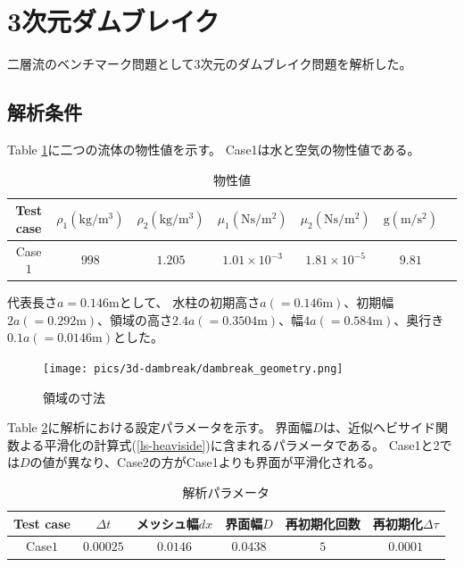 \newpage
\section{3次元ダムブレイク}
二層流のベンチマーク問題として3次元のダムブレイク問題を解析した。

\subsection{解析条件}

Table \ref{table:dambreak-material-property}に二つの流体の物性値を示す。
Case1は水と空気の物性値である。
\renewcommand{\arraystretch}{1}
\begin{table}[H]
	\centering
	\caption{物性値}
	\begin{tabular}{ccccccc}
		\hline
		Test case & $\rho_1 (\mathrm{kg/m^3})$ & $\rho_2 (\mathrm{kg/m^3})$ & $\mu_1 (\mathrm{Ns/m^2})$& $\mu_2 (\mathrm{Ns/m^2})$ & $\mathrm{g} (\mathrm{m/s^2})$ \\
		\hline 
		Case$1$ & $998$ & $1.205$   & $1.01\times10^{-3}$ & $1.81\times10^{-5}$ & $9.81$ \\
		\hline         
	\end{tabular}
	\label{table:dambreak-material-property}
\end{table}
\renewcommand{\arraystretch}{1.0}

代表長さ$a=0.146 \mathrm{m}$として、
水柱の初期高さ$a(=0.146\mathrm{m})$、初期幅$2a(=0.292\mathrm{m})$、領域の高さ$2.4a(=0.3504\mathrm{m})$、幅$4a(=0.584\mathrm{m})$、奥行き$0.1a(=0.0146\mathrm{m})$とした。

\begin{figure}[H]
	\centering
	\texttt{[image: pics/3d-dambreak/dambreak\_geometry.png]}
	\caption{領域の寸法\cite{Koshizuka1996}}
	\label{fig:3d-dambreak-geometry}
\end{figure}


Table \ref{table:dambreak-parameter}に解析における設定パラメータを示す。
界面幅$D$は、近似ヘビサイド関数よる平滑化の計算式(\ref{ls-heaviside})に含まれるパラメータである。
Case1と2では$D$の値が異なり、Case2の方がCase1よりも界面が平滑化される。
\renewcommand{\arraystretch}{1}
\begin{table}[H]
	\centering
	\caption{解析パラメータ}
	\begin{tabular}{cccccc}
		\hline
		Test case & $\Delta t$ & メッシュ幅$dx$ & 界面幅$D$ & 再初期化回数 & 再初期化$\Delta \tau$\\
		\hline 
		Case$1$ & $0.00025$ & $0.0146$ & $0.0438$ & $5$ & $0.0001$\\
		\hline         
	\end{tabular}
	\label{table:dambreak-parameter}
\end{table}
\renewcommand{\arraystretch}{1.0}

